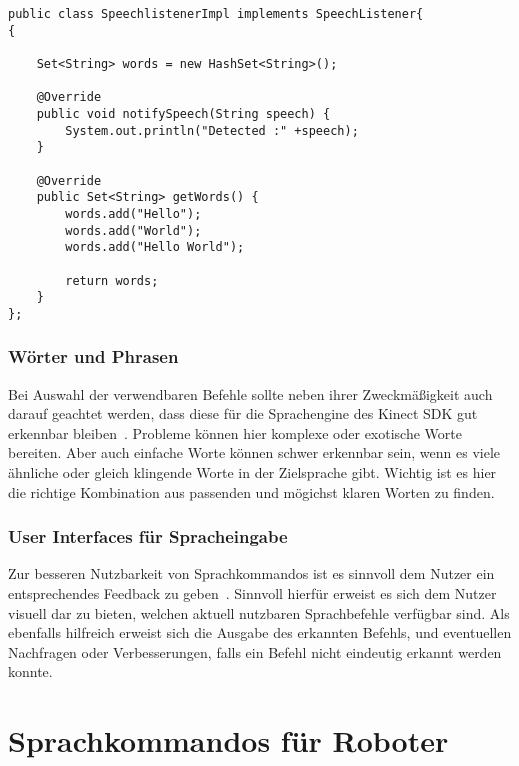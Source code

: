 \par\smallskip
\lstset{language=Java}
\begin{lstlisting}[caption={jnect SpeechListener Implementation}, label={listing:speechlistener}]
public class SpeechlistenerImpl implements SpeechListener{
{
			
	Set<String> words = new HashSet<String>();
			
	@Override
	public void notifySpeech(String speech) {
		System.out.println("Detected :" +speech);
	}
		
	@Override
	public Set<String> getWords() {
		words.add("Hello");
		words.add("World");
		words.add("Hello World");
				
		return words;
	}
};
\end{lstlisting}
\par\smallskip


\subsubsection{W\"orter und Phrasen}

Bei Auswahl der verwendbaren Befehle sollte neben ihrer Zweckm\"a\ss igkeit auch darauf geachtet werden, dass diese f\"ur die Sprachengine 
des Kinect SDK gut erkennbar bleiben~\cite{bib:kinect_hig}. Probleme k\"onnen hier komplexe oder exotische Worte bereiten. Aber auch einfache Worte k\"onnen schwer
erkennbar sein, wenn es viele \"ahnliche oder gleich klingende Worte in der Zielsprache gibt. Wichtig ist es hier die richtige Kombination aus
passenden und m\"ogichst klaren Worten zu finden. 

\subsubsection{User Interfaces f\"ur Spracheingabe}
Zur besseren Nutzbarkeit von Sprachkommandos ist es sinnvoll dem Nutzer ein entsprechendes Feedback zu geben~\cite{bib:kinect_hig}.
Sinnvoll hierf\"ur erweist es sich dem Nutzer visuell dar zu bieten, welchen aktuell nutzbaren Sprachbefehle verf\"ugbar sind.
Als ebenfalls hilfreich erweist sich die Ausgabe des erkannten Befehls, und eventuellen Nachfragen oder Verbesserungen, falls 
ein Befehl nicht eindeutig erkannt werden konnte.

\section{Sprachkommandos f\"ur Roboter}

